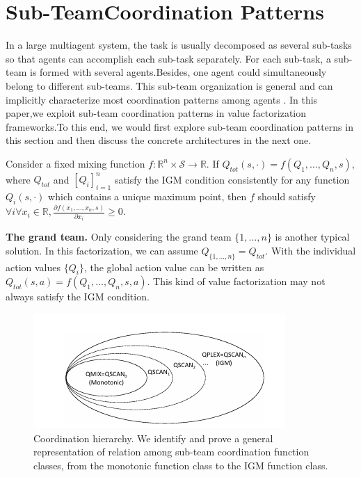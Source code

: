 
\section{Sub-TeamCoordination Patterns}
\label{sec:Sub-TeamCoordination Patterns}
    In a large multiagent system, the task is usually decomposed as several sub-tasks so that agents can accomplish each sub-task separately. For each sub-task, a sub-team is formed with several agents.Besides, one agent could simultaneously belong to different sub-teams. This sub-team organization is general and can implicitly characterize most coordination patterns among agents \cite{r8}. In this paper,we exploit sub-team coordination patterns in value factorization frameworks.To this end, we would first explore sub-team coordination patterns in this section and then discuss the concrete architectures in the next one.    


    \begin{proposition}
        Consider a fixed mixing function $f : \mathbb{R}^{n} \times \mathcal{S} \to \mathbb{R}$. If $Q_{tot}(s, \cdot) = f(Q_1, \ldots, Q_n, s)$, where $Q_{tot}$ and $[Q_i]_{i=1}^n$ satisfy the IGM condition consistently for any function $Q_i(s, \cdot)$ which contains a unique maximum point, then $f$ should satisfy $\forall i \forall x_i \in \mathbb{R}, \frac{\partial f(x_1,\ldots,x_n,s)}{\partial x_i} \geq 0$.
    \end{proposition}

    \textbf{The grand team.} Only considering the grand team $\{1,\ldots,n\}$ is another typical solution. In this factorization, we can assume $Q_{\{1,\ldots,n\}} = Q_{tot}$. With the individual action values $\{Q_i\}$, the global action value can be written as $Q_{tot}(s,a) = f(Q_1,\ldots,Q_n,s,a)$. This kind of value factorization may not always satisfy the IGM condition.

    \begin{figure}
    \centering
    \includegraphics[width=\linewidth]{images/ima3.png}
    \caption{Coordination hierarchy. We identify and prove a general representation of relation among sub-team coordination function classes, from the monotonic function class to the IGM function class.}
    \label{fig:ima3}
    \end{figure}

